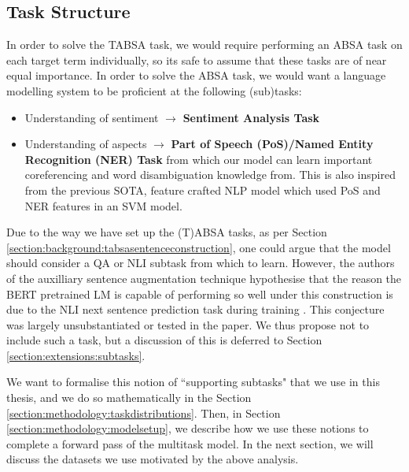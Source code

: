 \subsection{Task Structure} \label{section:methodology:taskstructure}
In order to solve the TABSA task, we would require performing an ABSA task on each target term individually, so its safe to assume that these tasks are of near equal importance. In order to solve the ABSA task, we would want a language modelling system to be proficient at the following (sub)tasks:
\begin{itemize}
	\item Understanding of sentiment $\rightarrow$ \textbf{Sentiment Analysis Task}
	\item Understanding of aspects $\rightarrow$ \textbf{Part of Speech (PoS)/Named Entity Recognition (NER) Task} from which our model can learn important coreferencing and word disambiguation knowledge from. This is also inspired from the previous SOTA, feature crafted NLP model \cite{Kiritchenko2014} which used PoS and NER features in an SVM model.
\end{itemize}
Due to the way we have set up the (T)ABSA tasks, as per Section \ref{section:background:tabsasentenceconstruction}, one could argue that the model should consider a QA or NLI subtask from which to learn. However, the authors of the auxilliary sentence augmentation technique hypothesise that the reason the BERT pretrained LM is capable of performing so well under this construction is due to the NLI next sentence prediction task during training \cite{Sun2019}. This conjecture was largely unsubstantiated or tested in the paper. We thus propose not to include such a task, but a discussion of this is deferred to Section \ref{section:extensions:subtasks}.

We want to formalise this notion of ``supporting subtasks" that we use in this thesis, and we do so mathematically in the Section \ref{section:methodology:taskdistributions}. Then, in Section \ref{section:methodology:modelsetup}, we describe how we use these notions to complete a forward pass of the multitask model. In the next section, we will discuss the datasets we use motivated by the above analysis.

